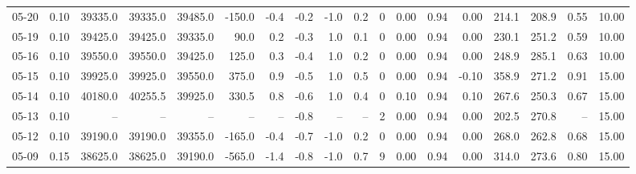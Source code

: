 \begin{threeparttable}
{\begin{tabular}{lrrrrrrrrrrrrrrrrr}
  05-20 &     0.10 & 39335.0 & 39335.0 & 39485.0 &     -150.0 &           -0.4 &                      -0.2 &                     -1.0 &                 0.2 &              0 &       0.00 &      0.94 &           0.00 &            214.1 &               208.9 &            0.55 &                  10.00 \\
  05-19 &     0.10 & 39425.0 & 39425.0 & 39335.0 &       90.0 &            0.2 &                      -0.3 &                      1.0 &                 0.1 &              0 &       0.00 &      0.94 &           0.00 &            230.1 &               251.2 &            0.59 &                  10.00 \\
  05-16 &     0.10 & 39550.0 & 39550.0 & 39425.0 &      125.0 &            0.3 &                      -0.4 &                      1.0 &                 0.2 &              0 &       0.00 &      0.94 &           0.00 &            248.9 &               285.1 &            0.63 &                  10.00 \\
  05-15 &     0.10 & 39925.0 & 39925.0 & 39550.0 &      375.0 &            0.9 &                      -0.5 &                      1.0 &                 0.5 &              0 &       0.00 &      0.94 &          -0.10 &            358.9 &               271.2 &            0.91 &                  15.00 \\
  05-14 &     0.10 & 40180.0 & 40255.5 & 39925.0 &      330.5 &            0.8 &                      -0.6 &                      1.0 &                 0.4 &              0 &       0.10 &      0.94 &           0.10 &            267.6 &               250.3 &            0.67 &                  15.00 \\
  05-13 &     0.10 &      -- &      -- &      -- &         -- &             -- &                      -0.8 &                       -- &                  -- &              2 &       0.00 &      0.94 &           0.00 &            202.5 &               270.8 &              -- &                  15.00 \\
  05-12 &     0.10 & 39190.0 & 39190.0 & 39355.0 &     -165.0 &           -0.4 &                      -0.7 &                     -1.0 &                 0.2 &              0 &       0.00 &      0.94 &           0.00 &            268.0 &               262.8 &            0.68 &                  15.00 \\
  05-09 &     0.15 & 38625.0 & 38625.0 & 39190.0 &     -565.0 &           -1.4 &                      -0.8 &                     -1.0 &                 0.7 &              9 &       0.00 &      0.94 &           0.00 &            314.0 &               273.6 &            0.80 &                  15.00 \\

\end{tabular}}
\end{threeparttable}
